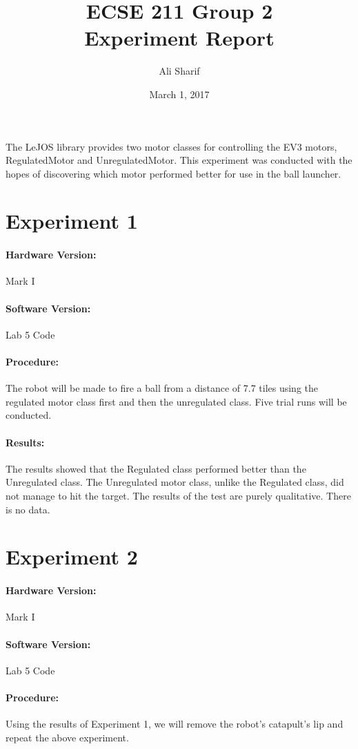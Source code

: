 \documentclass[a4]{article}
\title{ECSE 211 Group 2 \\ Experiment Report}
\author{Ali Sharif}
\date{March 1, 2017}
\begin{document}
\maketitle

The LeJOS library provides two motor classes for controlling the EV3 motors, RegulatedMotor and UnregulatedMotor. This experiment was conducted with the hopes of discovering which motor performed better for use in the ball launcher.

\section{Experiment 1}

\paragraph{Hardware Version:}Mark I
\paragraph{Software Version:}Lab 5 Code
\paragraph{Procedure:}The robot will be made to fire a ball from a distance of 7.7 tiles using the regulated motor class first and then the unregulated class. Five trial runs will be conducted.
\paragraph{Results:}The results showed that the Regulated class performed better than the Unregulated class. The Unregulated motor class, unlike the Regulated class, did not manage to hit the target. The results of the test are purely qualitative. There is no data.

\section{Experiment 2}
\paragraph{Hardware Version:}Mark I
\paragraph{Software Version:}Lab 5 Code
\paragraph{Procedure:} Using the results of Experiment 1, we will remove the robot's catapult's lip and repeat the above experiment.
\end{document}
